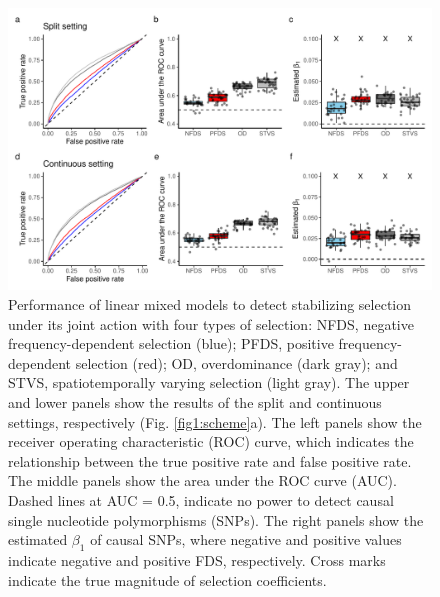 \documentclass[12pt,]{article}
\begin{document}
\begin{figure}[]
  \includegraphics[width=\linewidth]{beta1LMMdomi.pdf}
  \caption{Performance of linear mixed models to detect stabilizing selection under its joint action with four types of selection: NFDS, negative frequency-dependent selection (blue); PFDS, positive frequency-dependent selection (red); OD, overdominance (dark gray); and STVS, spatiotemporally varying selection (light gray). The upper and lower panels show the results of the split and continuous settings, respectively (Fig. \ref{fig1:scheme}a). The left panels show the receiver operating characteristic (ROC) curve, which indicates the relationship between the true positive rate and false positive rate. The middle panels show the area under the ROC curve (AUC). Dashed lines at AUC = 0.5, indicate no power to detect causal single nucleotide polymorphisms (SNPs). The right panels show the estimated $\beta_1$ of causal SNPs, where negative and positive values indicate negative and positive FDS, respectively. Cross marks indicate the true magnitude of selection coefficients.}
  \label{figS6:beta1LMM}
\end{figure}
\end{document}
